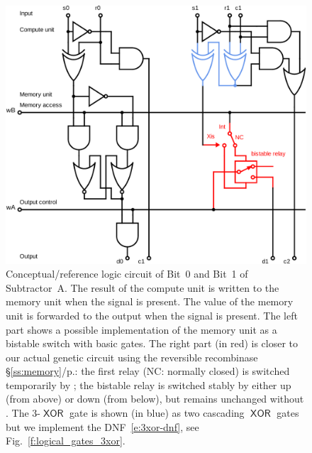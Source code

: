 \documentclass[12pt,notitlepage]{article}
\newcommand{\XOR}{\ensuremath{\mathop{\mathsf{XOR}}}\xspace}
\begin{document}
\begin{figure}[phbt]
\centering
\includegraphics[width=0.9\linewidth]{circuits/Logical-SubtractorA.svg.pdf}
%
\caption{%
Conceptual/reference
logic circuit of Bit~0 and Bit~1 of
Subtractor~A.
%
The result of the compute unit is written to the memory unit
when the signal  is present.
%
The value of the memory unit is
forwarded to the output
when the signal  is present.
%
The left part shows a possible implementation
of the memory unit 
as a bistable switch
with basic gates.
%
The right part (in {\color{DarkRed}red}) is closer
to our actual genetic circuit using
the reversible recombinase
\S\ref{ss:memory}/p.\pageref{ss:memory}:
the first relay (NC: normally closed)
is switched temporarily by ;
the bistable relay is switched stably by 
either up (from above) or down (from below),
but remains unchanged without .
%
%
The 3-\XOR gate
is shown (in {\color{DarkBlue}blue})
as two cascading \XOR gates
but we implement the DNF~\eqref{e:3xor-dnf},
see Fig.~\ref{f:logical_gates_3xor}.
}
\label{f:logical-subtractor01}
\end{figure}






\clearpage

\footnotesize


\normalsize




\clearpage
\end{document}
